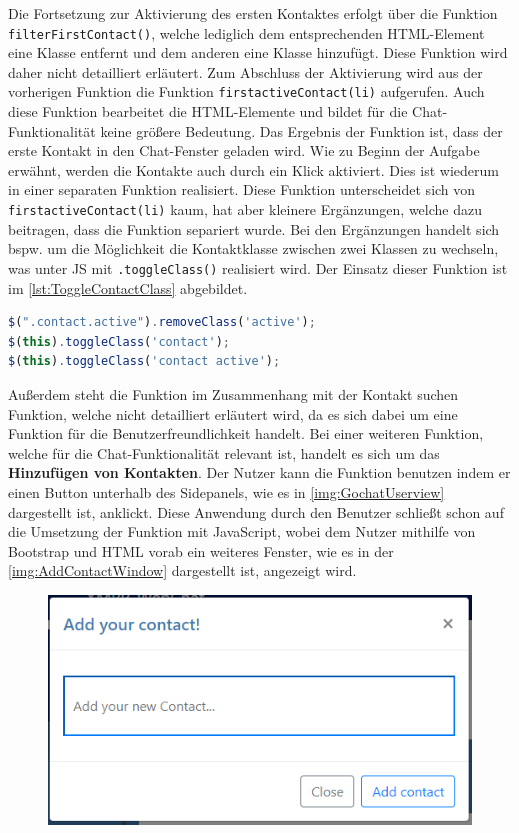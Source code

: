 \documentclass[a4paper,titlepage,halfparskip,12pt]{scrreprt}
\begin{document}
\begin{onehalfspacing}
Die Fortsetzung zur Aktivierung des ersten Kontaktes erfolgt über die Funktion \texttt{filterFirstContact()}, welche lediglich dem entsprechenden \ac{HTML}-Element eine Klasse entfernt und dem anderen eine Klasse hinzufügt. Diese Funktion wird daher nicht detailliert erläutert. Zum Abschluss der Aktivierung wird aus der vorherigen Funktion die Funktion \texttt{firstactiveContact(li)} aufgerufen. Auch diese Funktion bearbeitet die \ac{HTML}-Elemente und bildet für die Chat-Funktionalität keine größere Bedeutung. Das Ergebnis der Funktion ist, dass der erste Kontakt in den Chat-Fenster geladen wird. Wie zu Beginn der Aufgabe erwähnt, werden die Kontakte auch durch ein Klick aktiviert. Dies ist wiederum in einer separaten Funktion realisiert. Diese Funktion unterscheidet sich von \texttt{firstactiveContact(li)} kaum, hat aber kleinere Ergänzungen, welche dazu beitragen, dass die Funktion separiert wurde. Bei den Ergänzungen handelt sich bspw. um die Möglichkeit die Kontaktklasse zwischen zwei Klassen zu wechseln, was unter \ac{JS} mit \texttt{.toggleClass()} realisiert wird. Der Einsatz dieser Funktion ist im \autoref{lst:ToggleContactClass} abgebildet.
\begin{lstlisting}[language=Javascript,caption=Togglen der Klasse des ausgewählten Kontaktes,label={lst:ToggleContactClass}]
$(".contact.active").removeClass('active');
$(this).toggleClass('contact');
$(this).toggleClass('contact active');
\end{lstlisting}
Außerdem steht die Funktion im Zusammenhang mit der \glqq Kontakt suchen\grqq{} Funktion, welche nicht detailliert erläutert wird, da es sich dabei um eine Funktion für die Benutzerfreundlichkeit handelt. Bei einer weiteren Funktion, welche für die Chat-Funktionalität relevant ist, handelt es sich um das \textbf{Hinzufügen von Kontakten}. Der Nutzer kann die Funktion benutzen indem er einen Button unterhalb des Sidepanels, wie es in \autoref{img:GochatUserview} dargestellt ist, anklickt. Diese Anwendung durch den Benutzer schließt schon auf die Umsetzung der Funktion mit JavaScript, wobei dem Nutzer mithilfe von Bootstrap und \ac{HTML} vorab ein weiteres Fenster, wie es in der \autoref{img:AddContactWindow} dargestellt ist, angezeigt wird. 
\begin{figure}[h]
	\centering
	\includegraphics[scale=1.0]{images/AddContactWindow}

\end{figure}
\end{onehalfspacing}
\end{document}
